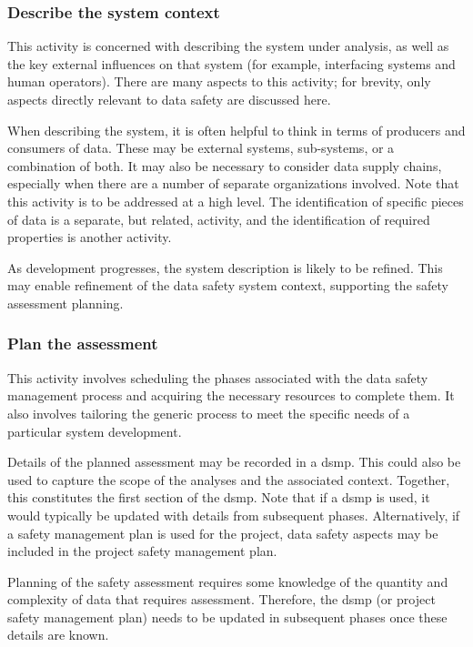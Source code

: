 \subsubsection{Describe the system context}
This activity is concerned with describing the system under analysis, as well as the key external influences on that system (for example, interfacing systems and human operators). There are many aspects to this activity; for brevity, only aspects directly relevant to data safety are discussed here.

When describing the system, it is often helpful to think in terms of producers and consumers of data. These may be external systems, sub-systems, or a combination of both. It may also be necessary to consider data supply chains, especially when there are a number of separate organizations involved. Note that this activity is to be addressed at a high level. The identification of specific pieces of data is a separate, but related, activity, and the identification of required properties is another activity.

As development progresses, the system description is likely to be refined. This may enable refinement of the data safety system context, supporting the \gls{safety assessment} planning.

\subsubsection{Plan the assessment}
This activity involves scheduling the phases associated with the data safety management process and acquiring the necessary resources to complete them. It also involves \gls{tailoring} the generic process to meet the specific needs of a particular system development. 

Details of the planned assessment may be recorded in a \gls{dsmp}. This could also be used to capture the scope of the analyses and the associated context. Together, this constitutes the first section of the \gls{dsmp}. Note that if a \gls{dsmp} is used, it would typically be updated with details from subsequent phases. Alternatively, if a safety management plan is used for the project, data safety aspects may be included in the project safety management plan. 

Planning of the \gls{safety assessment} requires some knowledge of the quantity and complexity of data that requires assessment. Therefore, the \gls{dsmp} (or project safety management plan) needs to be updated in subsequent phases once these details are known.


